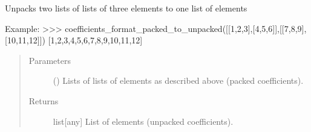 \documentclass[letterpaper,10pt,english]{sphinxmanual}
\begin{document}
\begin{fulllineitems}
\label{\detokenize{coefficients_shapes:mermin_on_qiskit.coefficients_shapes.coefficients_format_packed_to_unpacked}}
Unpacks two lists of lists of three elements to one list of elements

Example:
\textgreater{}\textgreater{}\textgreater{}  coefficients\_format\_packed\_to\_unpacked({[}{[}1,2,3{]},{[}4,5,6{]}{]},{[}{[}7,8,9{]},{[}10,11,12{]}{]})
{[}1,2,3,4,5,6,7,8,9,10,11,12{]}
\begin{quote}\begin{description}
\item[{Parameters}] \leavevmode
{}\sphinxstyleliteralstrong{\sphinxupquote{, }} (\sphinxstyleliteralemphasis{\sphinxupquote{{[}}}\sphinxstyleliteralemphasis{\sphinxupquote{{[}}}\sphinxstyleliteralemphasis{\sphinxupquote{{]}}}\sphinxstyleliteralemphasis{\sphinxupquote{{]}}}) \textendash{} Lists of lists of 
elements as described above (packed coefficients).

\item[{Returns}] \leavevmode
list{[}any{]} \textendash{} List of elements (unpacked coefficients).

\end{description}\end{quote}

\end{fulllineitems}

\end{document}
